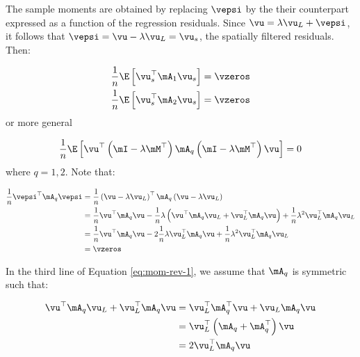\documentclass[english,12pt]{book}\usepackage[]{graphicx}\usepackage[]{xcolor}
\begin{document}
The sample moments are obtained by replacing $\vepsi$ by the their counterpart expressed as a function of the regression residuals. Since $\vu = \lambda \vu_L + \vepsi$, it follows that $\vepsi = \vu - \lambda \vu_L =\vu_s$, the spatially filtered residuals. Then:


\begin{equation}\label{eq:moment_conditions_reduced_u}
	\begin{aligned}
\frac{1}{n}\E\left[\vu_s^\top\mA_1\vu_s\right] & =  \vzeros \\
\frac{1}{n}\E\left[\vu_s^\top\mA_2\vu_s\right] & =  \vzeros
	\end{aligned}
\end{equation}
%
or more general

\begin{equation}\label{eq:moment_conditions_reduced_u_b}
\frac{1}{n}\E\left[\vu^\top\left(\mI - \lambda \mM^\top\right)\mA_q\left(\mI - \lambda \mM^\top\right)\vu\right] = 0
\end{equation}
%
where $q = 1, 2$. Note that:

\begin{equation}\label{eq:mom-rev-1}
\begin{aligned}
  \frac{1}{n}\vepsi^\top\mA_q\vepsi & = \frac{1}{n}\left(\vu - \lambda \vu_L\right)^\top\mA_q\left(\vu - \lambda \vu_L\right) \\
                               & = \frac{1}{n}\vu^\top\mA_q\vu - \frac{1}{n}\lambda\left(\vu^\top\mA_q\vu_L + \vu_L^\top\mA_q\vu\right) +\frac{1}{n}\lambda^2\vu_L^\top\mA_q\vu_L \\
                               & = \frac{1}{n}\vu^\top\mA_q\vu - 2\frac{1}{n}\lambda\vu_L^\top\mA_q\vu +\frac{1}{n}\lambda^2\vu_L^\top\mA_q\vu_L \\
                               & = \vzeros
\end{aligned}
\end{equation}

In the third line of Equation \ref{eq:mom-rev-1}, we assume that $\mA_q$ is symmetric such that:

\begin{equation*}
\begin{aligned}
\vu^\top\mA_q\vu_L + \vu_L^\top\mA_q\vu & = \vu_L^\top \mA_q^\top\vu + \vu_L\mA_q\vu \\
                                        & = \vu_L^\top\left(\mA_q + \mA_q^\top\right) \vu \\
                                        & = 2\vu_L^\top\mA_q\vu
                                        \end{aligned}
\end{equation*}
\end{document}

